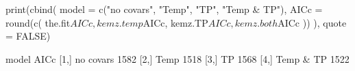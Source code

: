 \begin{Schunk}
\begin{Sinput}
 print(cbind(
   model = c("no covars", "Temp", "TP", "Temp & TP"),
   AICc = round(c(
     the.fit$AICc, kemz.temp$AICc, kemz.TP$AICc,
     kemz.both$AICc
   ))
 ), quote = FALSE)
\end{Sinput}
\begin{Soutput}
     model     AICc
[1,] no covars 1582
[2,] Temp      1518
[3,] TP        1568
[4,] Temp & TP 1522
\end{Soutput}
\end{Schunk}
